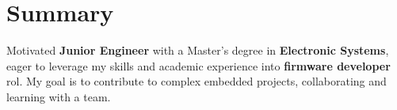 \section{Summary}
    \begin{minipage}{0.95\textwidth}
        Motivated \textbf{Junior Engineer} with a Master's degree in \textbf{Electronic Systems}, 
        eager to leverage my skills and academic experience into \textbf{firmware developer} rol.
        My goal is to contribute to complex embedded projects, collaborating and learning with a team.
    \end{minipage}